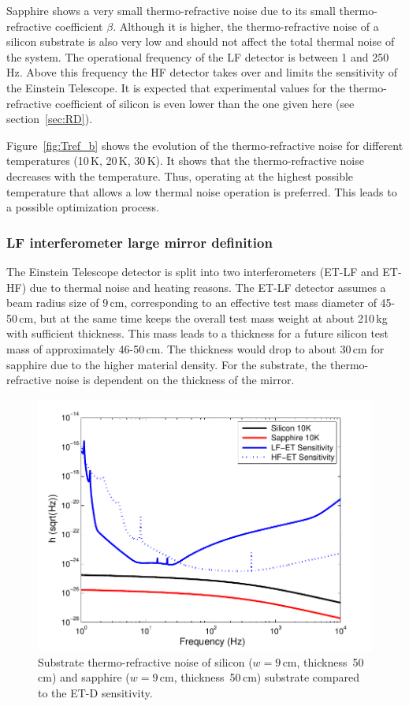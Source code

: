 Sapphire shows a very small thermo-refractive noise due to its small thermo-refractive coefficient $\beta$. Although it is higher, the thermo-refractive noise of a silicon substrate is also very low and should not affect the total thermal noise of the system. The operational frequency of the LF detector is between 1 and 250\,Hz. Above this frequency the HF detector takes over and limits the sensitivity of the Einstein Telescope. It is expected that experimental values for the thermo-refractive coefficient of silicon is even lower than the one given here (see section~\ref{sec:RD}).

Figure~\ref{fig:Tref_b} shows the evolution of the thermo-refractive noise for different temperatures (10\,K, 20\,K, 30\,K). It shows that the thermo-refractive noise decreases with the temperature. Thus, operating at the highest possible temperature that allows a low thermal noise operation is preferred. This leads to a possible optimization process.

\FloatBarrier
\subsubsection{LF interferometer large mirror definition}
\label{sec:LF_mirror_def}

The Einstein Telescope detector is split into two interferometers (ET-LF and ET-HF) due to thermal noise and heating reasons. The ET-LF detector assumes a beam radius size of 9\,cm, corresponding to an effective test mass diameter of 45-50\,cm, but at the same time keeps the overall test mass weight at about 210\,kg~\cite{Hild2010b} with sufficient thickness.
This mass leads to a thickness for a future silicon test mass of approximately 46-50\,cm. The thickness would drop to about 30\,cm for sapphire due to the higher material density. For the substrate, the thermo-refractive noise is dependent on the thickness of the mirror. 

\begin{figure}[!h]
\begin{center}
\includegraphics[width=0.49\linewidth]{Sec_Optics/LFSiandSa.pdf}
\caption{Substrate thermo-refractive noise of silicon ($w=9$\,cm, thickness~50\,cm) and sapphire ($w=9$\,cm, thickness~50\,cm) substrate compared to the ET-D sensitivity.}
\label{fig:LFSiandSa}
\end{center}
\end{figure}

